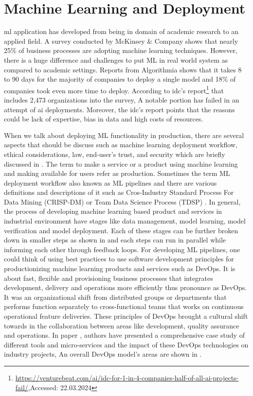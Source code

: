 \section{Machine Learning and Deployment \label{deployment_section}}
\acrshort{ml} application has developed from being in domain of academic research to an applied field. A survey conducted by McKinsey \& Company \cite{analytics2019global} shows that nearly 25\% of business processes are adopting machine learning techniques. However, there is a huge difference and challenges to put ML in real world system as compared to academic settings. Reports from Algorithmia \cite{wiggers2019algorithmia, hecht2019add} shows that it takes 8 to 90 days for the majority of companies to deploy a single model and 18\% of companies took even more time to deploy. According to \acrfull{idc}'s report\footnote{\url{https://venturebeat.com/ai/idc-for-1-in-4-companies-half-of-all-ai-projects-fail/},Accessed: 22.03.2024} that includes 2,473 organizations into the survey, A notable portion has failed in an attempt of \acrshort{ai} deployments. Moreover, the \acrshort{idc}'s report points that the reasons could be lack of expertise, bias in data and high costs of resources.

When we talk about deploying ML functionality in production, there are several aspects that should be discuss such as machine learning deployment workflow, ethical considerations, law, end-user's trust, and security which are briefly discussed in \cite{paleyes2022challenges}. The term to make a service or a product using machine learning and making available for users refer as production. Sometimes the term ML deployment workflow also known as ML pipelines and there are various definitions and descriptions of it such as Cros-Industry Standard Process For Data Mining (CRISP-DM) \cite{shearer2000crisp} or Team Data Science Process (TDSP) \cite{TDSP}. In general, the process of developing machine learning based product and services in industrial environment have stages like data management, model learning, model verification and model deployment. Each of these stages can be further broken down in smaller steps as shown in  and each steps can run in parallel while informing each other through feedback loops. For developing ML pipelines, one could think of using best practices to use software development principles for productionizing machine learning products and services such as DevOps. It is about fast, flexible and provisioning business processes that integrates development, delivery and operations more efficiently thus pronounce as DevOps. It was an organizational shift from distributed groups or departments that performs function separately to cross-functional teams that works on continuous operational feature deliveries. These principles of DevOps brought a cultural shift towards in the collaboration between areas like development, quality assurance and operations. In paper \cite{ebert2016devops}, authors have presented a comprehensive case study of different tools and micro-services and the impact of these DevOps technologies on industry projects, An overall DevOps model's areas are shown in . 

